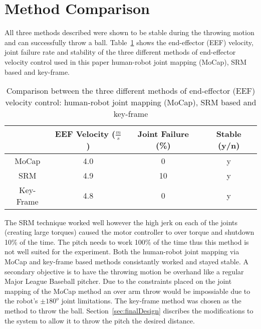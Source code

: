 \section{Method Comparison}\label{sec:comparison}
All three methods described were shown to be stable during the throwing motion and can successfully throw a ball.  Table~\ref{table:comp} shows the end-effector (EEF) velocity, joint failure rate and stability of the three different methods of end-effector velocity control used in this paper human-robot joint mapping (MoCap), SRM based and key-frame.

\begin{table}[!t]
\renewcommand{\arraystretch}{1.3}
\caption{Comparison between the three different methods of end-effector (EEF) velocity control: human-robot joint mapping (MoCap), SRM based and key-frame}
\label{table:comp}
\centering
\begin{tabular}{|c|c|c|c|}
\hline
  				& EEF Velocity ($\frac{m}{s}$)					& Joint Failure (\%)			& Stable (y/n) 	\\
\hline
MoCap 		& 4.0																		& 0												& y 						\\
\hline
SRM 			& 4.9																		& 10											& y							\\
\hline
Key-Frame & 4.8 																	& 0 											&	y							\\
\hline
\end{tabular}
\end{table}

The SRM technique worked well however the high jerk on each of the joints (creating large torques) caused the motor controller to over torque and shutdown 10\% of the time.  The pitch needs to work 100\% of the time thus this method is not well suited for the experiment.  Both the human-robot joint mapping via MoCap and key-frame based methods consistantly worked and stayed stable.  A secondary objective is to have the throwing motion be overhand like a regular Major League Baseball pitcher.  Due to the constraints placed on the joint mapping of the MoCap method an over arm throw would be impossiable due to the robot's $\pm180^o$ joint limitations.  The key-frame method was chosen as the method to throw the ball.  Section~\ref{sec:finalDesign} discribes the modifications to the system to allow it to throw the pitch the desired distance.